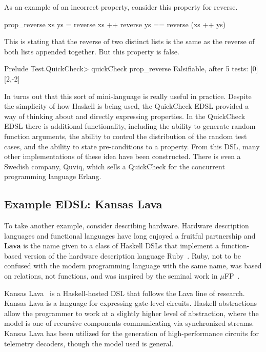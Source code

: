 \documentclass[11pt]{article}
\begin{document}
As an example of an incorrect property, consider this property for reverse.
\begin{Code}
prop_reverse xs ys = reverse xs ++ reverse ys == reverse (xs ++ ys)
\end{Code}
This is stating that the reverse of two distinct lists
is the same as the reverse of both lists appended together.
But this property is false.
\begin{Code}
Prelude Test.QuickCheck> quickCheck prop_reverse 
Falsifiable, after 5 tests:
[0]
[2,-2]
\end{Code}

In turns out that this sort of mini-language is really useful in practice.
Despite the simplicity of how Haskell is being used, the QuickCheck EDSL
provided a way of thinking about and directly expressing properties.
In the QuickCheck EDSL there is additional functionality, including
the ability to generate random function arguments, the ability to control
the distribution of the random test cases, and the ability to state pre-conditions
to a property. From this DSL, many other implementations of
these idea have been constructed. There is even a Swedish company, Quviq,
which sells a QuickCheck for the concurrent programming language Erlang.

\subsection{Example EDSL: Kansas Lava}\label{sec:KansasLava}

To take another example, consider describing hardware.
Hardware description languages and functional languages have
long enjoyed a fruitful partnership and
{\bf Lava} is the name given to a class of Haskell DSLs
that implement a function-based version of the hardware description
language Ruby~\cite{Jones:90:Ruby,Hutton:93:RubyInterp}. Ruby, not to be confused with the
modern programming language with the same name, was based
on relations, not functions, and was inspired by
the seminal work in $\mu$FP~\cite{Sheeran:84:muFP}.

Kansas Lava~\cite{Gill:13:TypesKansasLava} is a Haskell-hosted DSL
that follows the Lava line of research.
Kansas Lava is a language for expressing gate-level circuits.
Haskell abstractions allow the programmer to work at
a slightly higher level of abstraction, where the model
is one of recursive components communicating via synchronized streams.
Kansas Lava has been utilized for the generation of high-performance circuits for telemetry decoders,
though the model used is general.
\end{document}
